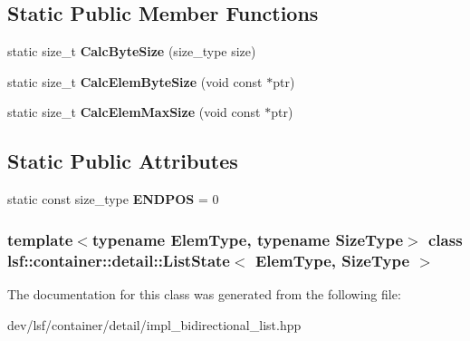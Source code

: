 \subsection*{Static Public Member Functions}
\begin{DoxyCompactItemize}
\item 
\hypertarget{classlsf_1_1container_1_1detail_1_1ListState_a635fa3f325735d1a05edff7c4bb110e1}{
static size\_\-t {\bfseries CalcByteSize} (size\_\-type size)}
\label{classlsf_1_1container_1_1detail_1_1ListState_a635fa3f325735d1a05edff7c4bb110e1}

\item 
\hypertarget{classlsf_1_1container_1_1detail_1_1ListState_a0819c52dafd7ea9be730c4e784b1f59b}{
static size\_\-t {\bfseries CalcElemByteSize} (void const $\ast$ptr)}
\label{classlsf_1_1container_1_1detail_1_1ListState_a0819c52dafd7ea9be730c4e784b1f59b}

\item 
\hypertarget{classlsf_1_1container_1_1detail_1_1ListState_a796d4226d6633e8793139da2f035396f}{
static size\_\-t {\bfseries CalcElemMaxSize} (void const $\ast$ptr)}
\label{classlsf_1_1container_1_1detail_1_1ListState_a796d4226d6633e8793139da2f035396f}

\end{DoxyCompactItemize}
\subsection*{Static Public Attributes}
\begin{DoxyCompactItemize}
\item 
\hypertarget{classlsf_1_1container_1_1detail_1_1ListState_a00fd41b8a72d126f5101062c59e7b1b9}{
static const size\_\-type {\bfseries ENDPOS} = 0}
\label{classlsf_1_1container_1_1detail_1_1ListState_a00fd41b8a72d126f5101062c59e7b1b9}

\end{DoxyCompactItemize}
\subsubsection*{template$<$typename ElemType, typename SizeType$>$ class lsf::container::detail::ListState$<$ ElemType, SizeType $>$}



The documentation for this class was generated from the following file:\begin{DoxyCompactItemize}
\item 
dev/lsf/container/detail/impl\_\-bidirectional\_\-list.hpp\end{DoxyCompactItemize}
